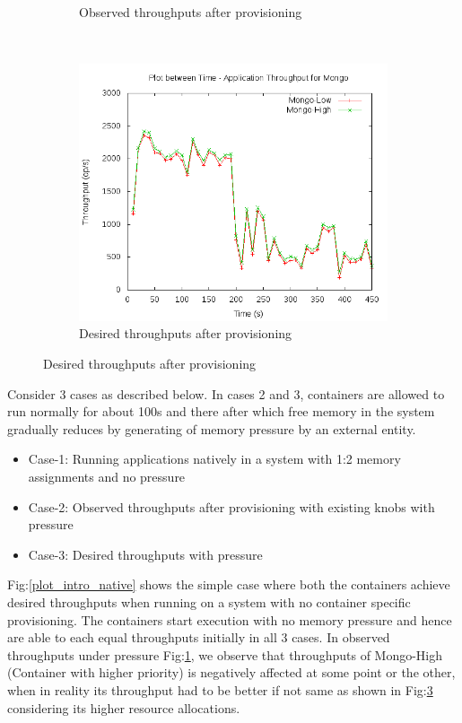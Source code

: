 \begin{figure}[t!]
\begin{subfigure}[t]{0.48\textwidth}
	    \caption{Observed throughputs after provisioning}
	    \label{plot_intro_observed}
	  \end{subfigure}
	  ~ 
	  \begin{subfigure}[t]{0.48\textwidth}
	    \centering
	    \includegraphics[width=1\textwidth]{images/intro/desired.png}
	    \caption{Desired throughputs after provisioning}
	    \label{plot_intro_desired}
	  \end{subfigure}
	\end{figure}
	
	Consider 3 cases as described below. In cases 2 and 3, containers are allowed to run normally for about 100s and there after 
which free memory in the system gradually reduces by generating of memory pressure by an external entity. 
	
	\begin{itemize}
	  \item Case-1: Running applications natively in a system with 1:2 memory assignments and no pressure 
	  \item Case-2: Observed throughputs after provisioning with existing knobs with pressure
	  \item Case-3: Desired throughputs with pressure
	\end{itemize}
	
	Fig:\ref{plot_intro_native} shows the simple case where both the containers achieve desired throughputs when running on a system 
with no container specific provisioning. The containers start execution with no memory pressure and hence are able to each equal 
throughputs initially in all 3 cases. In observed throughputs under pressure Fig:\ref{plot_intro_observed}, we observe that throughputs of 
Mongo-High (Container with higher priority) is negatively affected at some point or the other, when in reality its throughput had to be 
better if not same as shown in Fig:\ref{plot_intro_desired} considering its higher resource allocations. 
	
